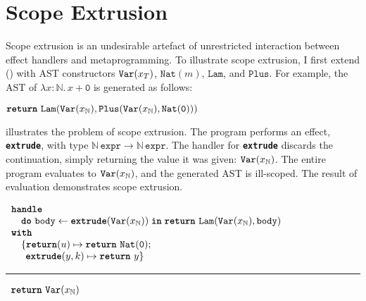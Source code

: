 \section{Scope Extrusion}\label{section:scope-extrusion-technical}
Scope extrusion is an undesirable artefact of unrestricted interaction between effect handlers and metaprogramming. To illustrate scope extrusion, I first extend \efflang{} () with AST constructors $\texttt{Var}(x_{T})$, $\texttt{Nat}(m)$, $\texttt{Lam}$, and $\texttt{Plus}$. For example, the AST of $\lambda x: \mathbb{N}. \, x + \texttt{0}$ is generated as follows:

\begin{eff}
$\texttt{\textbf{return}} \,\, {\texttt{Lam}(\texttt{Var}(x_{\mathbb{N}}), \texttt{Plus}(\texttt{Var}(x_{\mathbb{N}}), \texttt{Nat}(\texttt{0})))}$
\end{eff}

 illustrates the problem of scope extrusion. The program performs an effect, \textbf{\texttt{extrude}}, with type $\mathbb{N} \,  \texttt{expr} \to \mathbb{N} \, \texttt{expr}$. The handler for \textbf{\texttt{extrude}} discards the continuation, simply returning the value it was given: $\texttt{Var}(x_{\mathbb{N}})$. The entire program evaluates to $\texttt{Var}(x_{\mathbb{N}})$, and the generated AST is ill-scoped. The result of evaluation demonstrates scope extrusion.

\begin{code}
  \begin{efflst}
    $\begin{array}{l}
      \textbf{\texttt{handle}} \\
      \quad \texttt{\textbf{do}} \,\, {\texttt{body}} \leftarrow {\textbf{\texttt{extrude}}({\texttt{Var}(x_{\mathbb{N}})})} \; \textbf{\texttt{in}} \; {\texttt{\textbf{return}} \,\, {\texttt{Lam}(\texttt{Var}(x_{\mathbb{N}}), \texttt{body})}} \\
      \textbf{\texttt{with}} \\
      \quad \{ \textbf{\texttt{return}}(u) \mapsto {\texttt{\textbf{return}} \,\, {\texttt{Nat}(\texttt{0})}}; \\
      \quad \; \, \textbf{\texttt{extrude}}(y, k) \mapsto {\texttt{\textbf{return}} \,\, {y}}\}\\
    \end{array}$
  
    \vspace{2mm} 
  \textcolor{effComment}{\hrule height 0.2mm \relax}
  \vspace{2mm} 
  
  \textcolor{effComment}{$\begin{array}{l}\texttt{\textbf{return}} \,\, {\texttt{Var}(x_{\mathbb{N}})}\end{array}$}
  
  \end{efflst}
  \label{listing:efflang-scope-extrusion}
  \end{code}

